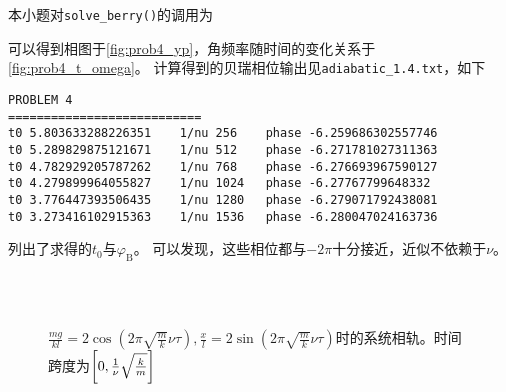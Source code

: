 \documentclass[a4paper,unicode]{report}
\begin{document}
本小题对\verb|solve_berry()|的调用为
{
    \linespread{1.0}
    
}

可以得到相图于\autoref{fig:prob4_yp}，角频率随时间的变化关系于\autoref{fig:prob4_t_omega}。
计算得到的贝瑞相位输出见\verb|adiabatic_1.4.txt|，如下
\begin{verbatim}
PROBLEM 4
===========================
t0 5.803633288226351	1/nu 256	phase -6.259686302557746
t0 5.289829875121671	1/nu 512	phase -6.271781027311363
t0 4.782929205787262	1/nu 768	phase -6.276693967590127
t0 4.279899964055827	1/nu 1024	phase -6.27767799648332
t0 3.776447393506435	1/nu 1280	phase -6.279071792438081
t0 3.273416102915363	1/nu 1536	phase -6.280047024163736
\end{verbatim}
列出了求得的$t_0$与$\varphi_\mathrm{B}$。
可以发现，这些相位都与$-2\pi$十分接近，近似不依赖于$\nu$。
\begin{figure}
    \centering
    \\
    \\
    \caption{$\frac{mg}{kl} = 2\cos(2\pi \sqrt{\frac{m}{k}}\nu\tau),\frac{x}{l} = 2\sin(2\pi \sqrt{\frac{m}{k}}\nu\tau)$时的系统相轨。时间跨度为$\qty[0, \frac{1}{\nu}\sqrt{\frac{k}{m}}]$}
    \label{fig:prob4_yp}
\end{figure}
\end{document}
